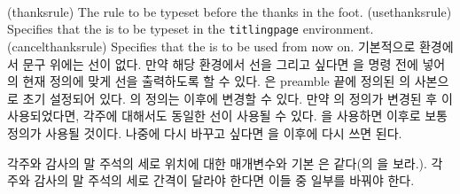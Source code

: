 \begin{syntax}
\cmd{\thanksrule} \\
\cmd{\usethanksrule} \\
\cmd{\cancelthanksrule} \\
\end{syntax}
\glossary(thanksrule)%
  {}%
  {The rule to be typeset before the thanks in the foot.}
\glossary(usethanksrule)%
  {}%
  {Specifies that the  is to be typeset in the 
   \texttt{titlingpage} environment.}
\glossary(cancelthanksrule)%
  {}%
  {Specifies that the  is to be used from now on.}
기본적으로  환경에서 \cmd{\thanks} 문구 위에는 선이 없다.
만약 해당 환경에서 선을 그리고 싶다면 \cmd{\usethanksrule}을 \cmd{\maketitle}
명령 전에 넣어 \cmd{\thanksrule}의 현재 정의에 맞게 선을 출력하도록 할 수 있다.
\cmd{\thanksrule}은 preamble 끝에 정의된 \cmd{\footnoterule}의
사본으로 초기 설정되어 있다.
\cmd{\thanksrule}의 정의는 \verb|| 이후에 변경할 수 있다.
만약 \cmd{\thanksrule}의 정의가 변경된 후 \cmd{\usethanksrule}이 사용되었다면,
각주에 대해서도 동일한 선이 사용될 수 있다.
\cmd{\cancelthanksrule}을 사용하면 이후로 보통 \cmd{\footnoterule} 정의가
사용될 것이다.
나중에 다시 바꾸고 싶다면 \cmd{\usethanksrule}을 이후에 다시 쓰면 된다.

각주와 감사의 말 주석의 세로 위치에 대한 매개변수와 기본
\cmd{\footnoterule}은 같다(의 을 보라.).
각주와 감사의 말 주석의 세로 간격이 달라야 한다면 이들 중
일부를 바꿔야 한다.



